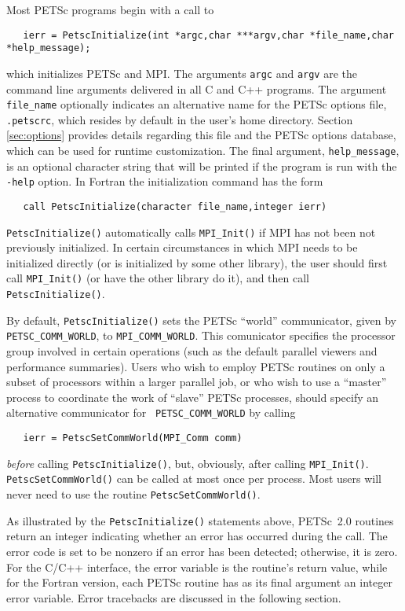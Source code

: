 Most PETSc programs begin with a call to 
\begin{verbatim}
   ierr = PetscInitialize(int *argc,char ***argv,char *file_name,char *help_message);
\end{verbatim} 
which initializes PETSc and MPI.  The arguments {\tt argc} and 
{\tt argv} are the command line arguments delivered in all C and C++
programs.  The argument {\tt file\_name}
optionally indicates an alternative name for the PETSc options file,
{\tt .petscrc}, which resides by default in the user's home directory.
Section \ref{sec:options} provides details regarding
this file and the PETSc options database, which can be used for runtime
customization. The final argument, {\tt help\_message}, is an optional
character string that will be printed if the program is run with the
{\tt -help} option.  In Fortran the initialization command has the form
\begin{verbatim}
   call PetscInitialize(character file_name,integer ierr)
\end{verbatim} 
{\tt PetscInitialize()} automatically calls {\tt MPI\_Init()} if MPI
has not been not previously initialized. In certain 
circumstances in which MPI needs to be initialized directly (or is
initialized by some other library), the user should first call 
{\tt MPI\_Init()} (or have the other library do it), and then call
{\tt PetscInitialize()}.

By default, {\tt PetscInitialize()} sets the PETSc ``world''
communicator, given by {\tt PETSC\_COMM\_WORLD}, to {\tt MPI\_COMM\_WORLD}.
This comunicator specifies the processor group involved in certain
operations (such as the default parallel viewers and performance
summaries).  Users who wish to employ PETSc routines on only a subset
of processors within a larger parallel job, or who wish to use a
``master'' process to coordinate the work of ``slave'' PETSc
processes, should specify an alternative communicator for {\tt
PETSC\_COMM\_WORLD} by calling 
\begin{verbatim}
   ierr = PetscSetCommWorld(MPI_Comm comm)
\end{verbatim}
{\em before} calling {\tt PetscInitialize()}, but, obviously, after
calling {\tt MPI\_Init()}. {\tt PetscSetCommWorld()} can be called
at most once per process. Most users will never need to use the routine
{\tt PetscSetCommWorld()}.

As illustrated by the {\tt PetscInitialize()} statements above,
PETSc~2.0 routines return an integer indicating whether an error has
occurred during the call.  The error code is set to be nonzero if an
error has been detected; otherwise, it is zero.  For the C/C++
interface, the error variable is the routine's return value, while for
the Fortran version, each PETSc routine has as its final argument an
integer error variable.  Error tracebacks are discussed in the following
section.

